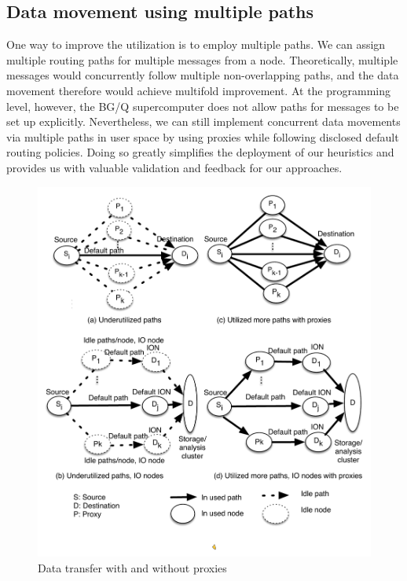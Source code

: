 \documentclass[final,5p,times]{elsarticle}
\begin{document}
\subsection{Data movement using multiple paths}
One way to improve the utilization is to employ multiple paths.
We can assign multiple routing paths for multiple messages from a node. Theoretically, multiple messages would concurrently follow multiple non-overlapping paths, 
and the data movement therefore would achieve multifold improvement. At the programming level, however, the BG/Q supercomputer does not allow paths for messages to be set up explicitly. Nevertheless, we can still implement concurrent data movements via multiple paths in user space by using proxies while following disclosed default routing policies. Doing so greatly simplifies the deployment of our heuristics and provides us with valuable validation and feedback for our approaches.

\begin{figure}[!htb]
\vspace{-0.1in}
\centering
\hspace*{-0.4cm}\includegraphics[scale=0.5]{multiply.pdf}
\vspace{-0.3in}
\caption{Data transfer with and without proxies}
\vspace{-0.1in}
\label{fig:multiply}
\end{figure}
\end{document}
